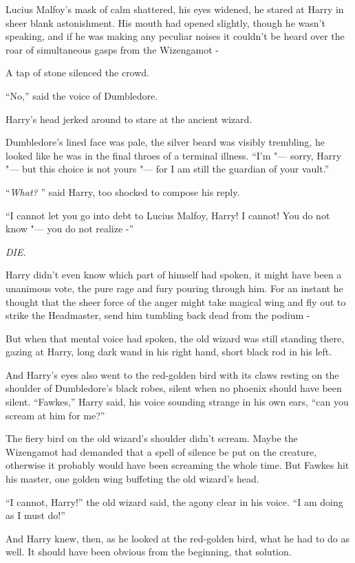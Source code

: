 Lucius Malfoy's mask of calm shattered, his eyes widened, he stared at
Harry in sheer blank astonishment. His mouth had opened slightly, though
he wasn't speaking, and if he was making any peculiar noises it couldn't
be heard over the roar of simultaneous gasps from the Wizengamot -

A tap of stone silenced the crowd.

``No,'' said the voice of Dumbledore.

Harry's head jerked around to stare at the ancient wizard.

Dumbledore's lined face was pale, the silver beard was visibly
trembling, he looked like he was in the final throes of a terminal
illness. ``I'm "--- sorry, Harry "--- but this choice is not yours "--- for I am
still the guardian of your vault.''

``\emph{What?} '' said Harry, too shocked to compose his reply.

``I cannot let you go into debt to Lucius Malfoy, Harry! I cannot! You
do not know "--- you do not realize -''

\emph{DIE.}

Harry didn't even know which part of himself had spoken, it might have
been a unanimous vote, the pure rage and fury pouring through him. For
an instant he thought that the sheer force of the anger might take
magical wing and fly out to strike the Headmaster, send him tumbling
back dead from the podium -

But when that mental voice had spoken, the old wizard was still standing
there, gazing at Harry, long dark wand in his right hand, short black
rod in his left.

And Harry's eyes also went to the red-golden bird with its claws resting
on the shoulder of Dumbledore's black robes, silent when no phoenix
should have been silent. ``Fawkes,'' Harry said, his voice sounding
strange in his own ears, ``can you scream at him for me?''

The fiery bird on the old wizard's shoulder didn't scream. Maybe the
Wizengamot had demanded that a spell of silence be put on the creature,
otherwise it probably would have been screaming the whole time. But
Fawkes hit his master, one golden wing buffeting the old wizard's head.

``I cannot, Harry!'' the old wizard said, the agony clear in his voice.
``I am doing as I must do!''

And Harry knew, then, as he looked at the red-golden bird, what he had
to do as well. It should have been obvious from the beginning, that
solution.

